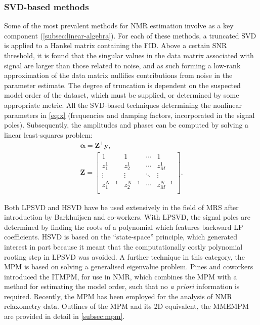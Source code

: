 \subsubsection{\acs{SVD}-based methods}
Some of the most prevalent methods for \ac{NMR} estimation involve 
as a key component (\cref{subsec:linear-algebra}). For each of these methods,
a truncated \ac{SVD} is applied to a Hankel matrix containing the \ac{FID}.
Above a certain \ac{SNR} threshold, it is found that the singular values in the data matrix associated with signal are
larger than those related to noise, and as such forming a low-rank
approximation of the data matrix nullifies contributions from noise in the
parameter estimate.
The degree of truncation is dependent on the suspected model order of the
dataset, which must be supplied, or determined by some appropriate metric.
All the \ac{SVD}-based techniques determining the nonlinear
parameters in \cref{eq:x} (frequencies and damping factors, incorporated in
the signal poles).
Subsequently, the amplitudes and phases can be computed by solving a
linear least-squares problem:
\begin{subequations}
    \begin{gather}
        \symbf{\alpha} = \symbf{Z}^+ \symbf{y},\\
        \symbf{Z} = \begin{bmatrix}
            1 & 1 & \cdots & 1 \\
            z_1^1 & z_2^1 & \cdots & z_M^1\\
            \vdots & \vdots & \ddots & \vdots\\
            z_1^{N-1} & z_2^{N-1} & \cdots & z_M^{N-1}\\
            \end{bmatrix}.
    \end{gather}
    \label{eq:complex-amplitudes}
\end{subequations}

Both \ac{LPSVD}\cite{Kumaresan1982,Kumaresan1983} and
\ac{HSVD}\cite{Kung1983} have be used extensively in the field of \ac{MRS}
after introduction by Barkhuijsen and
co-workers\cite{Barkhuijsen1985a,Barkhuijsen1985b,Barkhuijsen1987,Beer1988,Pijnappel1992}.
With
\ac{LPSVD}, the signal poles are determined by finding the roots of a
polynomial which features backward \ac{LP} coefficients. \ac{HSVD} is
based on the ``state-space'' principle, which generated interest in part
because it meant that the computationally costly polynomial rooting step in
\ac{LPSVD} was avoided.
A further technique in this category, the
\ac{MPM}\cite{Hua1990,Hua1990b,Hua1991} is based on solving a generalised
eigenvalue problem.  Pines and coworkers introduced the \ac{ITMPM}\cite{Lin1997},
for use in \ac{NMR}, which combines the \ac{MPM} with a method for estimating
the model order, such that no \textit{a priori} information is required.
Recently, the \ac{MPM} has been employed for the analysis of \ac{NMR}
relaxometry data\cite{Fricke2020, Wortge2023}.
Outlines of the \ac{MPM} and its \ac{2D} equivalent, the
\ac{MMEMPM}\cite{Hua1992,Chen2007} are provided in detail in
\cref{subsec:mpm}.


